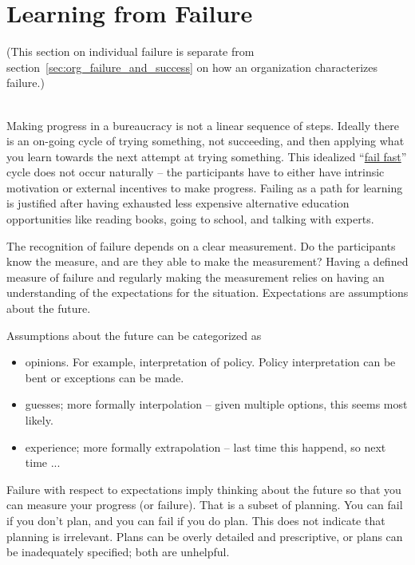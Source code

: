 \section{Learning from Failure\label{sec:learn_from_failure}}

(This section on individual failure is separate from section~\ref{sec:org_failure_and_success} on how an organization characterizes failure.)

\ \\

Making progress in a bureaucracy is not a linear sequence of steps. Ideally there is an on-going cycle of trying something, not succeeding, and then applying what you learn towards the next attempt at trying something. This idealized ``\href{https://en.wikipedia.org/wiki/Fail-fast#Business}{fail fast}'' cycle does not occur naturally -- the participants have to either have intrinsic motivation or external incentives to make progress. Failing as a path for learning is justified after having exhausted less expensive alternative education opportunities like reading books, going to school, and talking with experts. 

The recognition of failure depends on a clear measurement. Do the participants know the measure, and are they able to make the measurement? Having a defined measure of failure and regularly making the measurement relies on having an understanding of the expectations for the situation. Expectations are assumptions about the future.

Assumptions about the future can be categorized as
\begin{itemize}
    \item opinions. For example, interpretation of policy. Policy interpretation can be bent or exceptions can be made. 
    \item guesses; more formally interpolation -- given multiple options, this seems most likely.
    \item experience; more formally extrapolation -- last time this happend, so next time ...
\end{itemize}

Failure with respect to expectations imply thinking about the future so that you can measure your progress (or failure). That is a subset of planning. You can fail if you don't plan, and you can fail if you do plan. This does not indicate that planning is irrelevant. Plans can be overly detailed and prescriptive, or plans can be inadequately specified; both are unhelpful.

